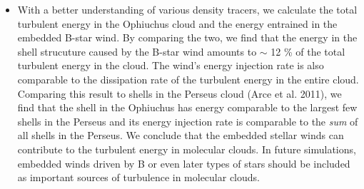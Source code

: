 \documentclass[11pt,a4paper]{emulateapj}
\begin{document}
\begin{itemize}
\item With a better understanding of various density tracers, we calculate the total turbulent energy in the Ophiuchus cloud and the energy entrained in the embedded B-star wind. By comparing the two, we find that the energy in the shell strucuture caused by the B-star wind amounts to $\sim$ 12 \% of the total turbulent energy in the cloud. The wind's energy injection rate is also comparable to the dissipation rate of the turbulent energy in the entire cloud. Comparing this result to shells in the Perseus cloud (Arce et al. 2011), we find that the shell in the Ophiuchus has energy comparable to the largest few shells in the Perseus and its energy injection rate is comparable to the \emph{sum} of all shells in the Perseus. We conclude that the embedded stellar winds can contribute to the turbulent energy in molecular clouds. In future simulations, embedded winds driven by B or even later types of stars should be included as important sources of turbulence in molecular clouds.
\end{itemize}



\end{document}
